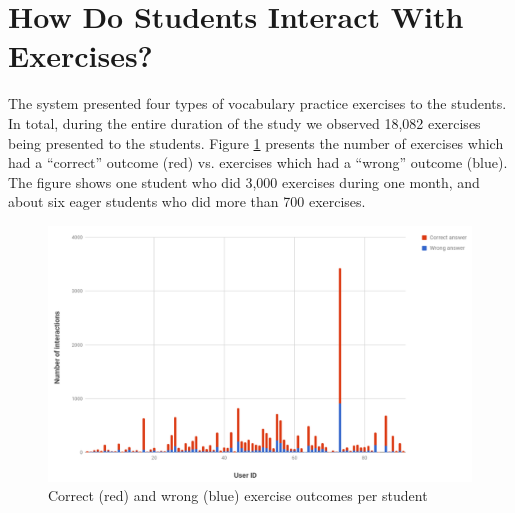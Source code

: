 





\section{How Do Students Interact With Exercises?}

The system presented four types of vocabulary practice exercises to the students. In total, during the entire duration of the study we observed 18,082 exercises being presented to the students. Figure \ref{fig:ex_interactions} presents the number of exercises which had a ``correct'' outcome (red) vs. exercises which had a ``wrong'' outcome (blue). The figure shows one student who did 3,000 exercises during one month, and about six eager students who did more than 700 exercises. 

  \begin{figure}[h!]
  \centering
    \includegraphics[width=\columnwidth]{figures/exercise_interactions_count.png}
    \caption{Correct (red) and wrong (blue) exercise outcomes per student}
    \label{fig:ex_interactions}
  \end{figure}

